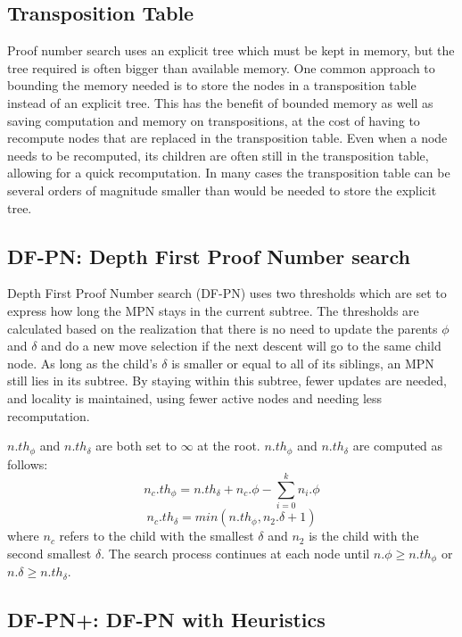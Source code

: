 \subsection{Transposition Table}

Proof number search uses an explicit tree which must be kept in memory, but the tree required is often bigger than available memory. One common approach to bounding the memory needed is to store the nodes in a transposition table instead of an explicit tree. This has the benefit of bounded memory as well as saving computation and memory on transpositions, at the cost of having to recompute nodes that are replaced in the transposition table. Even when a node needs to be recomputed, its children are often still in the transposition table, allowing for a quick recomputation. In many cases the transposition table can be several orders of magnitude smaller than would be needed to store the explicit tree.


\subsection{DF-PN: Depth First Proof Number search} \label{sec:DF-PN}

Depth First Proof Number search (DF-PN)\cite{nagai1999-DFPN} uses two thresholds which are set to express how long the MPN stays in the current subtree. The thresholds are calculated based on the realization that there is no need to update the parents $\phi$ and $\delta$ and do a new move selection if the next descent will go to the same child node. As long as the child's $\delta$ is smaller or equal to all of its siblings, an MPN still lies in its subtree. By staying within this subtree, fewer updates are needed, and locality is maintained, using fewer active nodes and needing less recomputation.

$n.th_\phi$ and $n.th_\delta$ are both set to $\infty$ at the root. $n.th_\phi$ and $n.th_\delta$ are computed as follows: $$n_c.th_\phi = n.th_\delta + n_c.\phi - \displaystyle\sum\limits_{i=0}^k n_i. \phi$$ $$n_c.th_\delta = min(n.th_\phi, n_2.\delta + 1)$$ where $n_c$ refers to the child with the smallest $\delta$ and $n_2$ is the child with the second smallest $\delta$. The search process continues at each node until $n.\phi \geq n.th_\phi$ or $n.\delta \geq n.th_\delta$.


\subsection{DF-PN+: DF-PN with Heuristics} \label{sec:DF-PN+}

